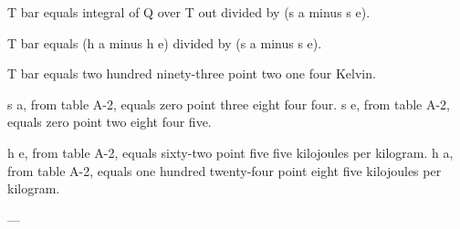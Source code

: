 T bar equals integral of Q over T out divided by (s a minus s e).  

T bar equals (h a minus h e) divided by (s a minus s e).  

T bar equals two hundred ninety-three point two one four Kelvin.  

s a, from table A-2, equals zero point three eight four four.  
s e, from table A-2, equals zero point two eight four five.  

h e, from table A-2, equals sixty-two point five five kilojoules per kilogram.  
h a, from table A-2, equals one hundred twenty-four point eight five kilojoules per kilogram.  

---